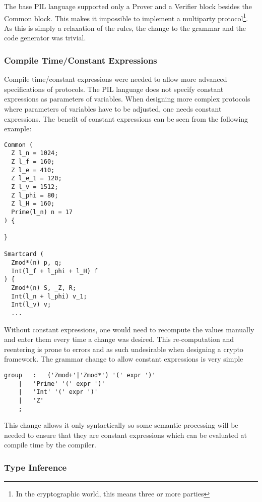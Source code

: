 The base PIL language supported only a Prover and a Verifier block
besides the Common block. This makes it impossible to implement a
multiparty protocol\footnote{In the cryptographic world, this means
  three or more parties}. As this is simply a relaxation of the rules,
the change to the grammar and the code generator was trivial.

\subsubsection{Compile Time/Constant Expressions}

Compile time/constant expressions were needed to allow more advanced
specifications of protocols. The PIL language does not specify
constant expressions as parameters of variables. When designing more
complex protocols where parameters of variables have to be adjusted,
one needs constant expressions. The benefit of constant expressions
can be seen from the following example:
\begin{lstlisting}[language=PIL]
Common (
  Z l_n = 1024;
  Z l_f = 160;
  Z l_e = 410;
  Z l_e_1 = 120;
  Z l_v = 1512;
  Z l_phi = 80;
  Z l_H = 160;
  Prime(l_n) n = 17
) {

}

Smartcard (
  Zmod*(n) p, q;
  Int(l_f + l_phi + l_H) f
) {
  Zmod*(n) S, _Z, R;
  Int(l_n + l_phi) v_1;
  Int(l_v) v;
  ...
\end{lstlisting}
Without constant expressions, one would need to recompute the values
manually and enter them every time a change was desired. This
re-computation and reentering is prone to errors and as such
undesirable when designing a crypto framework. The grammar change to
allow constant expressions is very simple
\begin{lstlisting}[language=grammar, keywords={group, expr}]
group	:	('Zmod+'|'Zmod*') '(' expr ')' 
	|	'Prime' '(' expr ')'
	|	'Int' '(' expr ')'
	|	'Z'
	;
\end{lstlisting}
This change allows it only syntactically so some semantic processing
will be needed to ensure that they are constant expressions which can
be evaluated at compile time by the compiler.

\subsubsection{Type Inference}

